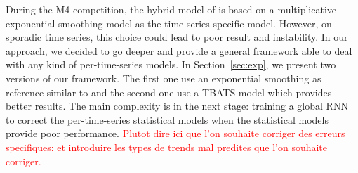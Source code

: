 \documentclass{article} %
\newcommand{\ts}{y}
\newcommand{\fullts}{{\bf \ts}}
\newcommand{\lag}{h}
\begin{document}
During the M4 competition, the hybrid model of \cite{smyl2020hybrid} is based on a multiplicative exponential smoothing model as the time-series-specific model. However, on sporadic time series, this choice could lead to poor result and instability. In our approach, we decided to go deeper and provide a general framework able to deal with any kind of per-time-series models. In Section~\ref{sec:exp}, we present two versions of our framework. The first one use an  exponential smoothing as reference  similar to \cite{smyl2020hybrid} and the second one use a TBATS model \cite{doi:10.1198/jasa.2011.tm09771} which provides better results. The main complexity is in the next stage: training a global RNN to correct the per-time-series statistical models when the statistical models provide poor performance. \textcolor{red}{Plutot dire ici que l'on souhaite corriger des erreurs specifiques: et introduire les types de trends mal predites que l'on souhaite corriger.}

\end{document}
